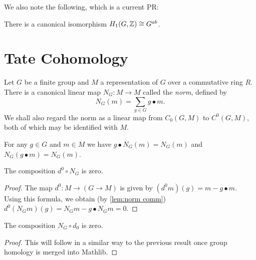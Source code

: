 We also note the following, which is a current PR:

\begin{lemma}	\label{lem:homology 1 Z}
	\leanok
	There is a canonical isomorphism $H_{1}(G,{\mathbb Z}) \cong G^{ab}$.
\end{lemma}

\section{Tate Cohomology}

\begin{definition} \label{def:norm}
	Let $G$ be a finite group and $M$ a representation of $G$ over a commutative ring $R$.
	There is a canonical linear map $N_G : M \to M$ called the \emph{norm},
	defined by
	\[
		N_G(m) = \sum_{g \in G} g \bullet m.
	\]
	We shall also regard the norm as a linear map from $C_0(G,M)$ to $C^0(G,M)$, both of which may
	be identified with $M$.
\end{definition}

\begin{lemma}	\label{lem:norm comm}
	\leanok
	For any $g \in G$ and $m \in M$ we have $g \bullet N_G (m) = N_G (m)$
	and $N_G (g \bullet m) = N_G (m)$.
\end{lemma}

\begin{lemma}	\label{lem:norm comp d}
	\leanok
	The composition $d^0 \circ N_G$ is zero.
\end{lemma}

\begin{proof}
	The map $d^0 : M \to (G \to M)$ is given by
	$(d^0 m)(g) = m - g\bullet m$.
	Using this formula, we obtain (by \ref{lem:norm comm})
	$d^0 (N_G m) (g) = N_G m - g \bullet N_G m = 0$.
\end{proof}

\begin{lemma}	\label{lem:d comp norm}
	The composition $N_G \circ d_0$ is zero.
\end{lemma}

\begin{proof}
	This will follow in a similar way to the previous result
	once group homology is merged into Mathlib.
\end{proof}

